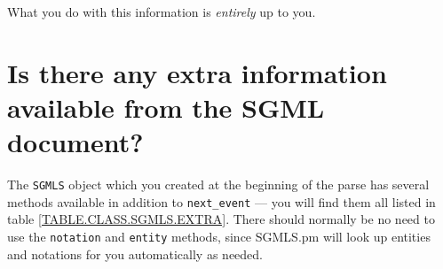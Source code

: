 What you do with this information is
{\em entirely\/} up to you.




\section{Is there any extra information available from the {\sc SGML}
document?}
\label{XTRAINFO}


The {\tt SGMLS}
object which you created at the beginning of the parse has several
methods available in addition to {\tt next\_event} {---}
you will find them all listed in table \ref{TABLE.CLASS.SGMLS.EXTRA}.  There should normally be no need to
use the {\tt notation} and {\tt entity}
methods, since {\sc SGMLS.pm} will look up entities and notations for you
automatically as needed.

